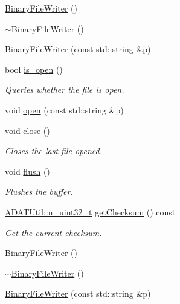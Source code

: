 \begin{DoxyCompactItemize}
\mbox{\hyperlink{classADATIO_1_1BinaryFileWriter_aa0579bad52db7809ed5d30b964aa3443}{Binary\+File\+Writer}} ()
\item 
\mbox{\hyperlink{classADATIO_1_1BinaryFileWriter_ae74f92826c49450ba710f22300718ada}{$\sim$\+Binary\+File\+Writer}} ()
\item 
\mbox{\hyperlink{classADATIO_1_1BinaryFileWriter_a7ccd0f56a5d98e909770f3198f94e9d9}{Binary\+File\+Writer}} (const std\+::string \&p)
\item 
bool \mbox{\hyperlink{classADATIO_1_1BinaryFileWriter_a891f81b41b18e3ba86c7e8af134b603e}{is\+\_\+open}} ()
\begin{DoxyCompactList}\small\item\em Queries whether the file is open. \end{DoxyCompactList}\item 
void \mbox{\hyperlink{classADATIO_1_1BinaryFileWriter_a943ba19816b403b36f50f72740ea856a}{open}} (const std\+::string \&p)
\item 
void \mbox{\hyperlink{classADATIO_1_1BinaryFileWriter_a20a1bdb753aaf28e60de49e80ddf953d}{close}} ()
\begin{DoxyCompactList}\small\item\em Closes the last file opened. \end{DoxyCompactList}\item 
void \mbox{\hyperlink{classADATIO_1_1BinaryFileWriter_ad914b901c6386a2ad7b2c8cf9bddfa9b}{flush}} ()
\begin{DoxyCompactList}\small\item\em Flushes the buffer. \end{DoxyCompactList}\item 
\mbox{\hyperlink{namespaceADATUtil_ad945a8afa4db2d1f89b731964adae97e}{A\+D\+A\+T\+Util\+::n\+\_\+uint32\+\_\+t}} \mbox{\hyperlink{classADATIO_1_1BinaryFileWriter_ad6f9d995a02d4b3e8e12ad18972d58a5}{get\+Checksum}} () const
\begin{DoxyCompactList}\small\item\em Get the current checksum. \end{DoxyCompactList}\item 
\mbox{\hyperlink{classADATIO_1_1BinaryFileWriter_aa0579bad52db7809ed5d30b964aa3443}{Binary\+File\+Writer}} ()
\item 
\mbox{\hyperlink{classADATIO_1_1BinaryFileWriter_ae74f92826c49450ba710f22300718ada}{$\sim$\+Binary\+File\+Writer}} ()
\item 
\mbox{\hyperlink{classADATIO_1_1BinaryFileWriter_a7ccd0f56a5d98e909770f3198f94e9d9}{Binary\+File\+Writer}} (const std\+::string \&p)

\end{DoxyCompactItemize}
